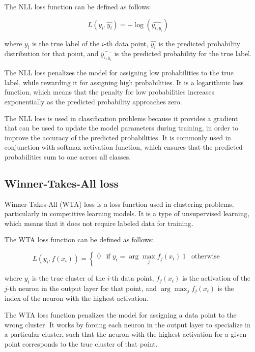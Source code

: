 The NLL loss function can be defined as follows:

\begin{equation}
	L(y_i, \hat{y_i}) = -\log(\hat{y_{i,y_i}})
\end{equation}

where $y_i$ is the true label of the $i$-th data point, $\hat{y_i}$ is the predicted probability distribution for that point, and $\hat{y_{i,y_i}}$ is the predicted probability for the true label.

The NLL loss penalizes the model for assigning low probabilities to the true label, while rewarding it for assigning high probabilities. It is a logarithmic loss function, which means that the penalty for low probabilities increases exponentially as the predicted probability approaches zero.

The NLL loss is used in classification problems because it provides a gradient that can be used to update the model parameters during training, in order to improve the accuracy of the predicted probabilities. It is commonly used in conjunction with softmax activation function, which ensures that the predicted probabilities sum to one across all classes.

\subsection{Winner-Takes-All loss}
\label{subsec:3_WTA_loss}

Winner-Takes-All (WTA) loss is a loss function used in clustering problems, particularly in competitive learning models. It is a type of unsupervised learning, which means that it does not require labeled data for training.

The WTA loss function can be defined as follows:

\begin{equation}
	L(y_i, f(x_i)) = \begin{cases}
		0 & \text{if } y_i = \arg\max_j f_j(x_i) \
		1 & \text{otherwise} \
	\end{cases}
\end{equation}

where $y_i$ is the true cluster of the $i$-th data point, $f_j(x_i)$ is the activation of the $j$-th neuron in the output layer for that point, and $\arg\max_j f_j(x_i)$ is the index of the neuron with the highest activation.

The WTA loss function penalizes the model for assigning a data point to the wrong cluster. It works by forcing each neuron in the output layer to specialize in a particular cluster, such that the neuron with the highest activation for a given point corresponds to the true cluster of that point.

